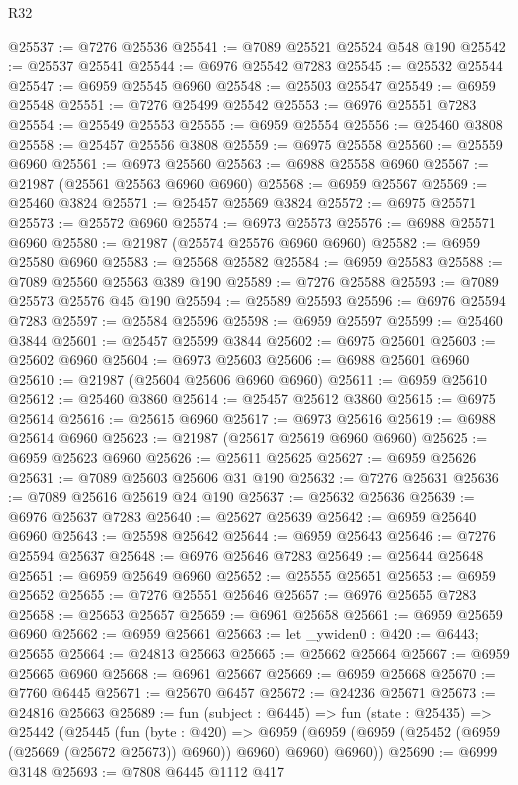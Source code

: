 \begin{lexlean}{R32}
\begin{coremodule}
@25537 := @7276 @25536
@25541 := @7089 @25521 @25524 @548 @190
@25542 := @25537 @25541
@25544 := @6976 @25542 @7283
@25545 := @25532 @25544
@25547 := @6959 @25545 @6960
@25548 := @25503 @25547
@25549 := @6959 @25548
@25551 := @7276 @25499 @25542
@25553 := @6976 @25551 @7283
@25554 := @25549 @25553
@25555 := @6959 @25554
@25556 := @25460 @3808
@25558 := @25457 @25556 @3808
@25559 := @6975 @25558
@25560 := @25559 @6960
@25561 := @6973 @25560
@25563 := @6988 @25558 @6960
@25567 := @21987 (@25561 @25563 @6960 @6960)
@25568 := @6959 @25567
@25569 := @25460 @3824
@25571 := @25457 @25569 @3824
@25572 := @6975 @25571
@25573 := @25572 @6960
@25574 := @6973 @25573
@25576 := @6988 @25571 @6960
@25580 := @21987 (@25574 @25576 @6960 @6960)
@25582 := @6959 @25580 @6960
@25583 := @25568 @25582
@25584 := @6959 @25583
@25588 := @7089 @25560 @25563 @389 @190
@25589 := @7276 @25588
@25593 := @7089 @25573 @25576 @45 @190
@25594 := @25589 @25593
@25596 := @6976 @25594 @7283
@25597 := @25584 @25596
@25598 := @6959 @25597
@25599 := @25460 @3844
@25601 := @25457 @25599 @3844
@25602 := @6975 @25601
@25603 := @25602 @6960
@25604 := @6973 @25603
@25606 := @6988 @25601 @6960
@25610 := @21987 (@25604 @25606 @6960 @6960)
@25611 := @6959 @25610
@25612 := @25460 @3860
@25614 := @25457 @25612 @3860
@25615 := @6975 @25614
@25616 := @25615 @6960
@25617 := @6973 @25616
@25619 := @6988 @25614 @6960
@25623 := @21987 (@25617 @25619 @6960 @6960)
@25625 := @6959 @25623 @6960
@25626 := @25611 @25625
@25627 := @6959 @25626
@25631 := @7089 @25603 @25606 @31 @190
@25632 := @7276 @25631
@25636 := @7089 @25616 @25619 @24 @190
@25637 := @25632 @25636
@25639 := @6976 @25637 @7283
@25640 := @25627 @25639
@25642 := @6959 @25640 @6960
@25643 := @25598 @25642
@25644 := @6959 @25643
@25646 := @7276 @25594 @25637
@25648 := @6976 @25646 @7283
@25649 := @25644 @25648
@25651 := @6959 @25649 @6960
@25652 := @25555 @25651
@25653 := @6959 @25652
@25655 := @7276 @25551 @25646
@25657 := @6976 @25655 @7283
@25658 := @25653 @25657
@25659 := @6961 @25658
@25661 := @6959 @25659 @6960
@25662 := @6959 @25661
@25663 := let _ywiden0 : @420 := @6443; @25655
@25664 := @24813 @25663
@25665 := @25662 @25664
@25667 := @6959 @25665 @6960
@25668 := @6961 @25667
@25669 := @6959 @25668
@25670 := @7760 @6445
@25671 := @25670 @6457
@25672 := @24236 @25671
@25673 := @24816 @25663
@25689 := fun (subject : @6445) =>
  fun (state : @25435) =>
  @25442
    (@25445
      (fun (byte : @420) =>
      @6959 (@6959 (@6959 (@25452 (@6959 (@25669 (@25672 @25673)) @6960)) @6960) @6960) @6960))
@25690 := @6999 @3148
@25693 := @7808 @6445 @1112 @417

\end{coremodule}
\end{lexlean}
